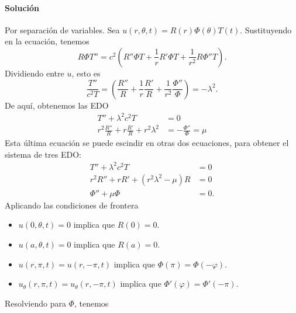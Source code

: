 \documentclass[11pt,letterpaper,draft]{report}
\theoremstyle{plain}
\theoremstyle{definition}
\theoremstyle{remark}
\newcommand\<{\langle}
\renewcommand\>{\rangle}
\renewcommand\phi\varphi
\begin{document}
\paragraph{Solución}
Por separación de variables.
Sea $u(r,\theta,t)=R(r)\Phi(\theta)T(t)$.
Sustituyendo en la ecuación, tenemos
\[
  R\Phi T''
  = c^{2}
  \left(R''\Phi T
  +\frac{1}{r}R'\Phi T
  +\frac{1}{r^{2}}R\Phi''T\right)
.\]
Dividiendo entre $u$, esto es
\[
  \frac{T''}{c^{2}T}
  =
  \left(
    \frac{R''}{R}
    +\frac{1}{r}\frac{R'}{R}
    +\frac{1}{r^{2}}\frac{\Phi''}{\Phi}
  \right)
  =-\lambda^{2}
.\]
De aquí, obtenemos las EDO
\begin{align*}
  T''+\lambda^{2}c^{2}T &= 0 \\
  r^{2}\frac{R''}{R}
  +r\frac{R'}{R}
  +r^{2}\lambda^{2}
  &=
  -\frac{\Phi''}{\Phi}
  = \mu
\end{align*}
Esta última ecuación se puede escindir en otras dos ecuaciones, para
obtener el sistema de tres EDO:
\begin{align*}
  T''+\lambda^{2}c^{2}T &= 0 \\
  r^{2}R'' +rR' +(r^{2}\lambda^{2}-\mu)R &= 0 \\
  \Phi'' +\mu\Phi &= 0.
\end{align*}
Aplicando las condiciones de frontera
\begin{itemize}
  \item
    $u(0,\theta,t)=0$ implica que $R(0)=0$.
  \item
    $u(a,\theta,t)=0$ implica que $R(a)=0$.
  \item
    $u(r,\pi,t)=u(r,-\pi,t)$ implica que $\Phi(\pi)=\Phi(-\phi)$.
  \item
    $u_\theta(r,\pi,t)=u_\theta(r,-\pi,t)$ implica que
    $\Phi'(\phi)=\Phi'(-\pi)$.
\end{itemize}
Resolviendo para $\Phi$, tenemos
\end{document}
